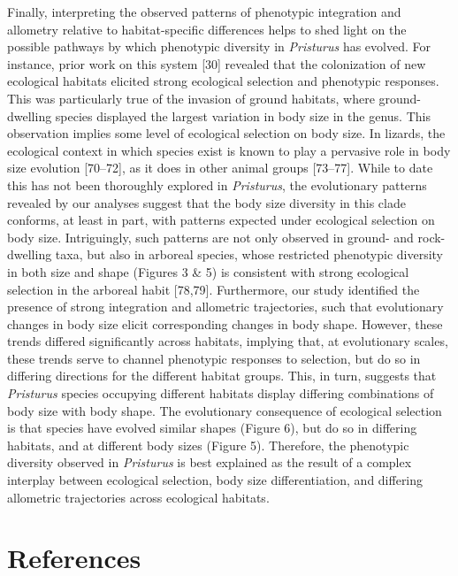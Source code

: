 \documentclass[
  11pt,
]{article}
\begin{document}
Finally, interpreting the observed patterns of phenotypic integration
and allometry relative to habitat-specific differences helps to shed
light on the possible pathways by which phenotypic diversity in
\emph{Pristurus} has evolved. For instance, prior work on this system
{[}30{]} revealed that the colonization of new ecological habitats
elicited strong ecological selection and phenotypic responses. This was
particularly true of the invasion of ground habitats, where
ground-dwelling species displayed the largest variation in body size in
the genus. This observation implies some level of ecological selection
on body size. In lizards, the ecological context in which species exist
is known to play a pervasive role in body size evolution {[}70--72{]},
as it does in other animal groups {[}73--77{]}. While to date this has
not been thoroughly explored in \emph{Pristurus}, the evolutionary
patterns revealed by our analyses suggest that the body size diversity
in this clade conforms, at least in part, with patterns expected under
ecological selection on body size. Intriguingly, such patterns are not
only observed in ground- and rock-dwelling taxa, but also in arboreal
species, whose restricted phenotypic diversity in both size and shape
(Figures 3 \& 5) is consistent with strong ecological selection in the
arboreal habit {[}78,79{]}. Furthermore, our study identified the
presence of strong integration and allometric trajectories, such that
evolutionary changes in body size elicit corresponding changes in body
shape. However, these trends differed significantly across habitats,
implying that, at evolutionary scales, these trends serve to channel
phenotypic responses to selection, but do so in differing directions for
the different habitat groups. This, in turn, suggests that
\emph{Pristurus} species occupying different habitats display differing
combinations of body size with body shape. The evolutionary consequence
of ecological selection is that species have evolved similar shapes
(Figure 6), but do so in differing habitats, and at different body sizes
(Figure 5). Therefore, the phenotypic diversity observed in
\emph{Pristurus} is best explained as the result of a complex interplay
between ecological selection, body size differentiation, and differing
allometric trajectories across ecological habitats.

\newpage

\hypertarget{references}{%
\section*{References}\label{references}}
\end{document}
